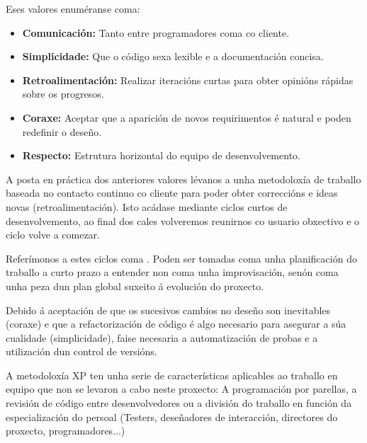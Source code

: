 Eses valores enuméranse coma\cite{xp}: 

\begin{itemize}
	\item \textbf{Comunicación:} Tanto entre programadores coma co cliente.
	\item \textbf{Simplicidade:} Que o código sexa lexible e a documentación concisa.
	\item \textbf{Retroalimentación:} Realizar iteracións curtas para obter opinións rápidas sobre os progresos.
	\item \textbf{Coraxe:} Aceptar que a aparición de novos requirimentos é natural e poden redefinir o deseño.
	\item \textbf{Respecto:} Estrutura horizontal do equipo de desenvolvemento.
\end{itemize}


A posta en práctica dos anteriores valores lévanos a unha metodoloxía de traballo baseada no contacto continuo co cliente para poder obter correccións e ideas novas (retroalimentación). Isto acádase mediante ciclos curtos de desenvolvemento, ao final dos cales volveremos reunirnos co usuario obxectivo e o ciclo volve a comezar. 

Referímonos a estes ciclos coma . Poden ser tomadas coma unha planificación do traballo a curto prazo a entender non coma unha improvisación, senón coma unha peza dun plan global suxeito á evolución do proxecto.

Debido á aceptación de que os sucesivos cambios no deseño son inevitables (coraxe) e que a refactorización de código é algo necesario para asegurar a súa cualidade (simplicidade), faise necesaria a automatización de probas e a utilización dun control de versións.

A metodoloxía XP ten unha serie de características aplicables ao traballo en equipo que non se levaron a cabo neste proxecto: A programación por parellas, a revisión de código entre desenvolvedores ou a división do traballo en función da especialización do persoal (Testers, deseñadores de interacción, directores do proxecto, programadores...)